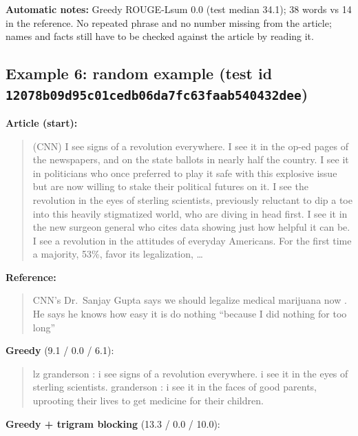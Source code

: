 \documentclass[10pt,a4paper]{article}
\begin{document}
\textbf{Automatic notes:} Greedy ROUGE-Lsum 0.0 (test median 34.1); 38 words vs 14 in the reference. No repeated phrase and no number missing from the article; names and facts still have to be checked against the article by reading it.

\hypertarget{example-6-random-example-test-id-12078b09d95c01cedb06da7fc63faab540432dee}{%
\subsection{\texorpdfstring{Example 6: random example (test id \texttt{12078b09d95c01cedb06da7fc63faab540432dee})}{Example 6: random example (test id 12078b09d95c01cedb06da7fc63faab540432dee)}}\label{example-6-random-example-test-id-12078b09d95c01cedb06da7fc63faab540432dee}}

\textbf{Article (start):}

\begin{quote}
(CNN) I see signs of a revolution everywhere. I see it in the op-ed pages of the newspapers, and on the state ballots in nearly half the country. I see it in politicians who once preferred to play it safe with this explosive issue but are now willing to stake their political futures on it. I see the revolution in the eyes of sterling scientists, previously reluctant to dip a toe into this heavily stigmatized world, who are diving in head first. I see it in the new surgeon general who cites data showing just how helpful it can be. I see a revolution in the attitudes of everyday Americans. For the first time a majority, 53\%, favor its legalization, \ldots{}
\end{quote}

\textbf{Reference:}

\begin{quote}
CNN's Dr.~Sanjay Gupta says we should legalize medical marijuana now .
He says he knows how easy it is do nothing ``because I did nothing for too long''
\end{quote}

\textbf{Greedy} (9.1 / 0.0 / 6.1):

\begin{quote}
lz granderson : i see signs of a revolution everywhere. i see it in the eyes of sterling scientists.
granderson : i see it in the faces of good parents, uprooting their lives to get medicine for their children.
\end{quote}

\textbf{Greedy + trigram blocking} (13.3 / 0.0 / 10.0):
\end{document}
